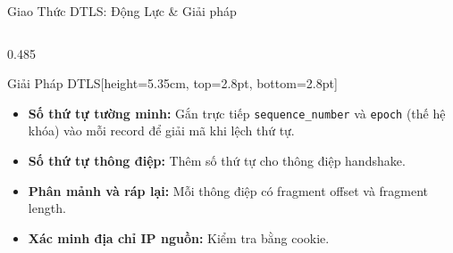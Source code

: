 \documentclass[aspectratio=169, 10pt]{beamer}
\begin{document}
\begin{frame}{Giao Thức DTLS: Động Lực \& Giải pháp}
\begin{columns}[T]
		\begin{column}{0.485\textwidth}
			\begin{accentcard}[uetgreen]{Giải Pháp DTLS}[height=5.35cm, top=2.8pt, bottom=2.8pt]
				\raggedright
				\setlength{\leftmargini}{9pt}
				\begin{itemize}\setlength{\itemsep}{4.5pt}\setlength{\topsep}{0pt}\fontsize{6.2pt}{7.8pt}\selectfont
					\item \textbf{Số thứ tự tường minh:} Gắn trực tiếp \texttt{sequence\_number} và \texttt{epoch} (thế hệ khóa) vào mỗi record để giải mã khi lệch thứ tự.
					\item \textbf{Số thứ tự thông điệp:} Thêm số thứ tự cho thông điệp handshake.
					\item \textbf{Phân mảnh và ráp lại:} Mỗi thông điệp có fragment offset và fragment length.
					\item \textbf{Xác minh địa chỉ IP nguồn:} Kiểm tra bằng cookie.
				\end{itemize}
			\end{accentcard}
		\end{column}
	\end{columns}
\end{frame}
\end{document}
